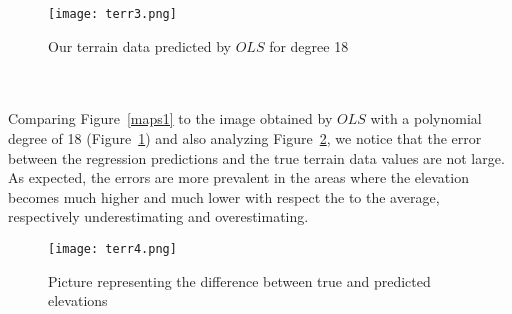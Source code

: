 \documentclass{emulateapj}
\begin{document}
\begin{figure}[H]
    \centering
    \texttt{[image: terr3.png]}
    \caption{Our terrain data predicted by $OLS$ for degree 18}
    \label{plot_OLS}
\end{figure}
\\
\\Comparing Figure~\ref{maps1} to the image obtained by $OLS$ with a polynomial degree of 18 (Figure~\ref{plot_OLS}) and also analyzing Figure~\ref{error}, we notice that the error between the regression predictions and the true terrain data values are not large. As expected, the errors are more prevalent in the areas where the elevation becomes much higher and much lower with respect the to the average, respectively underestimating and overestimating.
\begin{figure}[H]
    \centering
    \texttt{[image: terr4.png]}
    \caption{Picture representing the difference between true and predicted elevations}
    \label{error}
\end{figure}
\end{document}
